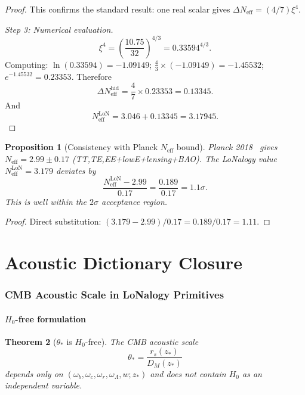 \documentclass[12pt]{article}
\theoremstyle{plain}
\newtheorem{theorem}{Theorem}[section]
\newtheorem{proposition}[theorem]{Proposition}
\theoremstyle{definition}
\numberwithin{equation}{section}
\newcommand{\eff}{\mathrm{eff}}
\newcommand{\LoN}{\mathrm{LoN}}
\newcommand{\hid}{\mathrm{hid}}
\begin{document}
\begin{proof}
This confirms the standard result: one real scalar gives
$\Delta N_{\eff}=(4/7)\xi^4$.

\emph{Step 3: Numerical evaluation.}
\begin{equation}
\xi^4 = \left(\frac{10.75}{32}\right)^{4/3}
= 0.33594^{4/3}.
\end{equation}
Computing: $\ln(0.33594)=-1.09149$; $\frac{4}{3}\times(-1.09149)=-1.45532$;
$e^{-1.45532}=0.23353$.
Therefore
\begin{equation}
\Delta N_{\eff}^{\hid} = \frac{4}{7}\times0.23353 = 0.13345.
\end{equation}
And
\begin{equation}
N_{\eff}^{\LoN} = 3.046 + 0.13345 = 3.17945.
\end{equation}
\end{proof}

\begin{proposition}[Consistency with Planck $N_{\eff}$ bound]\label{prop:Neffbound}
Planck 2018~\cite{Planck2018} gives
$N_{\eff}=2.99\pm0.17$ (TT,TE,EE+lowE+lensing+BAO).
The LoNalogy value $N_{\eff}^{\LoN}=3.179$ deviates by
\begin{equation}
\frac{N_{\eff}^{\LoN}-2.99}{0.17} = \frac{0.189}{0.17} = 1.1\sigma.
\end{equation}
This is well within the $2\sigma$ acceptance region.
\end{proposition}

\begin{proof}
Direct substitution: $(3.179-2.99)/0.17=0.189/0.17=1.11$.
\end{proof}


\part{Acoustic Dictionary Closure}

\section{CMB Acoustic Scale in LoNalogy Primitives}\label{sec:acoustic}

\subsection{$H_0$-free formulation}

\begin{theorem}[$\theta_*$ is $H_0$-free]\label{thm:thetafree}
The CMB acoustic scale
\begin{equation}
\theta_* = \frac{r_s(z_*)}{D_M(z_*)}
\end{equation}
depends only on $(\omega_b,\omega_c,\omega_r,\omega_\Lambda,w;z_*)$
and does not contain $H_0$ as an independent variable.
\end{theorem}
\end{document}
